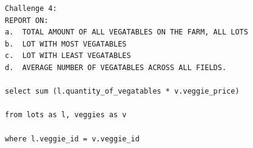 \begin{verbatim}
Challenge 4:
REPORT ON:
a.	TOTAL AMOUNT OF ALL VEGATABLES ON THE FARM, ALL LOTS
b.	LOT WITH MOST VEGATABLES
c.	LOT WITH LEAST VEGATABLES
d.	AVERAGE NUMBER OF VEGATABLES ACROSS ALL FIELDS.

select sum (l.quantity_of_vegatables * v.veggie_price) 

from lots as l, veggies as v

where l.veggie_id = v.veggie_id

\end{verbatim}